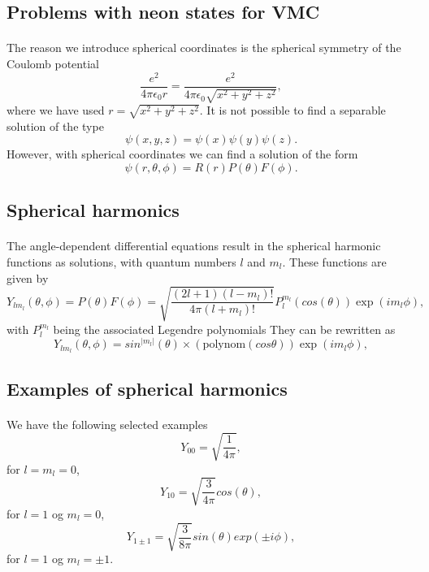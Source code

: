 \documentclass[%
twoside,                 %
final,                   %
10pt]{article}
\begin{document}
\subsection*{Problems with neon states for VMC}

\paragraph{}
The reason we introduce spherical coordinates is the spherical symmetry of the Coulomb potential
\[
    \frac{e^2}{4\pi\epsilon_0r}=\frac{e^2}{4\pi\epsilon_0\sqrt{x^2+y^2+z^2}},
\]
where we have used $r=\sqrt{x^2+y^2+z^2}$. 
It is not possible to find a separable solution of the type
\[
    \psi(x,y,z)=\psi(x)\psi(y)\psi(z).
\]
However, with spherical coordinates we can find a solution
of the form
\[
   \psi(r,\theta,\phi)=R(r)P(\theta)F(\phi).
\]






\subsection*{Spherical harmonics}

\paragraph{}

The angle-dependent differential equations result in the spherical harmonic functions as
solutions, with quantum numbers $l$ and $m_l$.
These functions are given by
\[
    Y_{lm_l}(\theta,\phi)=P(\theta)F(\phi)=\sqrt{\frac{(2l+1)(l-m_l)!}{4\pi (l+m_l)!}}
                      P_l^{m_l}(cos(\theta))\exp{(im_l\phi)},
\]
with $P_l^{m_l}$ being the associated Legendre polynomials
They can be rewritten as 
\[
   Y_{lm_l}(\theta,\phi)=sin^{|m_l|}(\theta) \times (\mathrm{polynom}(cos\theta))\exp{(im_l\phi)},
\]



\subsection*{Examples of spherical harmonics}

\paragraph{}
We have the following selected examples
\[
   Y_{00}=\sqrt{\frac{1}{4\pi}},
\]
for $l=m_l=0$, 
\[
   Y_{10}=\sqrt{\frac{3}{4\pi}}cos(\theta),
\]
for $l=1$ og $m_l=0$, 
\[
   Y_{1\pm 1}=\sqrt{\frac{3}{8\pi}}sin(\theta)exp(\pm i\phi),
\]
for  $l=1$ og $m_l=\pm 1$.
\end{document}
